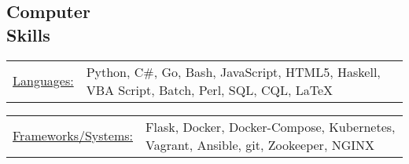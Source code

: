 \documentclass{res}
\begin{document}
\begin{resume}
\section{Computer \\ Skills}
   \begin{tabular}{l p{5in}}
    \underline{Languages:} & \raggedright Python, C\#, Go, Bash, JavaScript, HTML5, Haskell, VBA Script, Batch, Perl, SQL, CQL, \LaTeX\\
   \end{tabular}
   \begin{tabular}{l p{5in}}
    \underline{Frameworks/Systems:} & \raggedright Flask, Docker, Docker-Compose, Kubernetes, Vagrant, Ansible, git, Zookeeper, NGINX
 \end{tabular}
\end{resume} 
\end{document}
